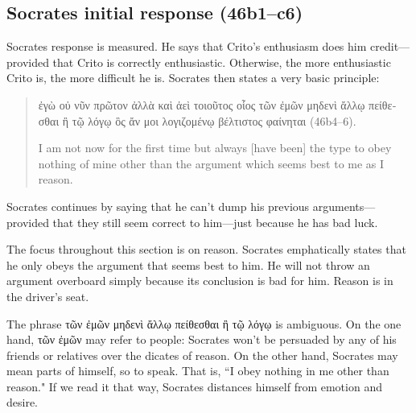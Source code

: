\documentclass[12pt,letterpaper]{article}
\begin{document}

\subsection*{Socrates initial response (46b1--c6)}

Socrates response is measured. He says that Crito's enthusiasm does him credit---provided that Crito is correctly enthusiastic. Otherwise, the more enthusiastic Crito is, the more difficult he is. Socrates then states a very basic principle:

\begin{quote}
    \textgreek{ἐγὼ οὐ νῦν πρῶτον ἀλλὰ καὶ ἀεὶ τοιοῦτος οἷος τῶν ἐμῶν μηδενὶ ἄλλῳ πείθεσθαι ἢ τῷ λόγῳ ὃς ἄν μοι λογιζομένῳ βέλτιστος φαίνηται} (46b4--6).

    I am not now for the first time but always [have been] the type to obey nothing of mine other than the argument which seems best to me as I reason.
\end{quote}

Socrates continues by saying that he can't dump his previous arguments---provided that they still seem correct to him---just because he has bad luck.

The focus throughout this section is on reason. Socrates emphatically states that he only obeys the argument that seems best to him. He will not throw an argument overboard simply because its conclusion is bad for him. Reason is in the driver's seat.

The phrase \textgreek{τῶν ἐμῶν μηδενὶ ἄλλῳ πείθεσθαι ἢ τῷ λόγῳ} is ambiguous. On the one hand, \textgreek{τῶν ἐμῶν} may refer to people: Socrates won't be persuaded by any of his friends or relatives over the dicates of reason. On the other hand, Socrates may mean parts of himself, so to speak. That is, ``I obey nothing in me other than reason." If we read it that way, Socrates distances himself from emotion and desire. 
\end{document}
